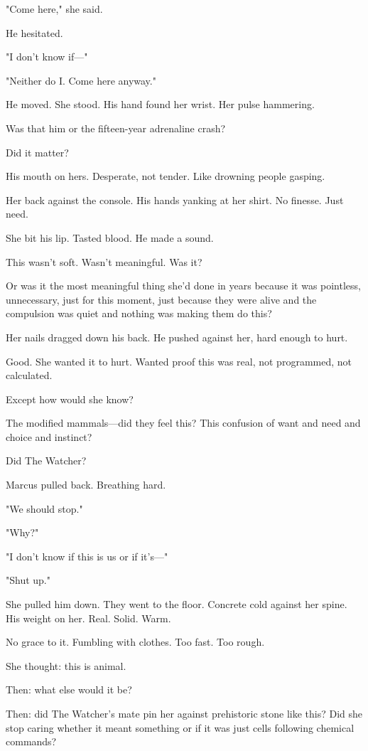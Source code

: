 "Come here," she said.

He hesitated.

"I don't know if—"

"Neither do I. Come here anyway."

He moved. She stood. His hand found her wrist. Her pulse hammering.

Was that him or the fifteen-year adrenaline crash?

Did it matter?

His mouth on hers. Desperate, not tender. Like drowning people gasping.

Her back against the console. His hands yanking at her shirt. No finesse. Just need.

She bit his lip. Tasted blood. He made a sound.

This wasn't soft. Wasn't meaningful. Was it?

Or was it the most meaningful thing she'd done in years because it was pointless, unnecessary, just for this moment, just because they were alive and the compulsion was quiet and nothing was making them do this?

Her nails dragged down his back. He pushed against her, hard enough to hurt.

Good. She wanted it to hurt. Wanted proof this was real, not programmed, not calculated.

Except how would she know?

The modified mammals—did they feel this? This confusion of want and need and choice and instinct?

Did The Watcher?

Marcus pulled back. Breathing hard.

"We should stop."

"Why?"

"I don't know if this is us or if it's—"

"Shut up."

She pulled him down. They went to the floor. Concrete cold against her spine. His weight on her. Real. Solid. Warm.

No grace to it. Fumbling with clothes. Too fast. Too rough.

She thought: this is animal.

Then: what else would it be?

Then: did The Watcher's mate pin her against prehistoric stone like this? Did she stop caring whether it meant something or if it was just cells following chemical commands?

